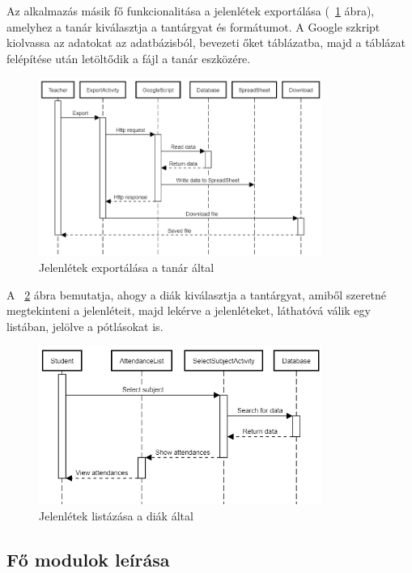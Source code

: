 \documentclass[12pt]{article}
\numberwithin{figure}{section}
\numberwithin{equation}{section}
\begin{document}
\hfill \break
Az alkalmazás másik fő funkcionalitása a jelenlétek exportálása (~\ref{fig:seq2} ábra), amelyhez a tanár kiválasztja a tantárgyat és formátumot. A Google szkript kiolvassa az adatokat az adatbázisból, bevezeti őket táblázatba, majd a táblázat felépítése után letöltődik a fájl a tanár eszközére.\\

\begin{figure}[H]
	\centering
	\includegraphics[width=350px]{seq_export.png}
	\caption{Jelenlétek exportálása a tanár által}
	\label{fig:seq2}
\end{figure}

\hfill \break
A ~\ref{fig:seq3} ábra bemutatja, ahogy a diák kiválasztja a tantárgyat, amiből szeretné megtekinteni a jelenléteit, majd lekérve a jelenléteket, láthatóvá válik egy listában, jelölve a pótlásokat is.\\

\begin{figure}[H]
	\centering
	\includegraphics[width=350px]{seq_ViewAtt.png}
	\caption{Jelenlétek listázása a diák által}
	\label{fig:seq3}
\end{figure}

\hfill \break

\subsection{Fő modulok leírása}
\end{document}
